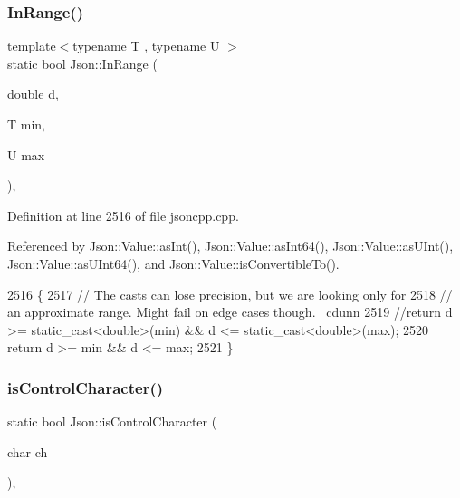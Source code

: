 \subsubsection{\texorpdfstring{In\+Range()}{InRange()}}
{\footnotesize\ttfamily template$<$typename T , typename U $>$ \\
static bool Json\+::\+In\+Range (\begin{DoxyParamCaption}\item[{double}]{d,  }\item[{T}]{min,  }\item[{U}]{max }\end{DoxyParamCaption})\hspace{0.3cm}{\ttfamily [inline]}, {\ttfamily [static]}}



Definition at line 2516 of file jsoncpp.\+cpp.



Referenced by Json\+::\+Value\+::as\+Int(), Json\+::\+Value\+::as\+Int64(), Json\+::\+Value\+::as\+U\+Int(), Json\+::\+Value\+::as\+U\+Int64(), and Json\+::\+Value\+::is\+Convertible\+To().


\begin{DoxyCode}
2516                                                    \{
2517   \textcolor{comment}{// The casts can lose precision, but we are looking only for}
2518   \textcolor{comment}{// an approximate range. Might fail on edge cases though. ~cdunn}
2519   \textcolor{comment}{//return d >= static\_cast<double>(min) && d <= static\_cast<double>(max);}
2520   \textcolor{keywordflow}{return} d >= min && d <= max;
2521 \}
\end{DoxyCode}
\mbox{\label{namespace_json_a0381e631737f51331065a388f4f59197}} 
\subsubsection{\texorpdfstring{is\+Control\+Character()}{isControlCharacter()}}
{\footnotesize\ttfamily static bool Json\+::is\+Control\+Character (\begin{DoxyParamCaption}\item[{char}]{ch }\end{DoxyParamCaption})\hspace{0.3cm}{\ttfamily [inline]}, {\ttfamily [static]}}



